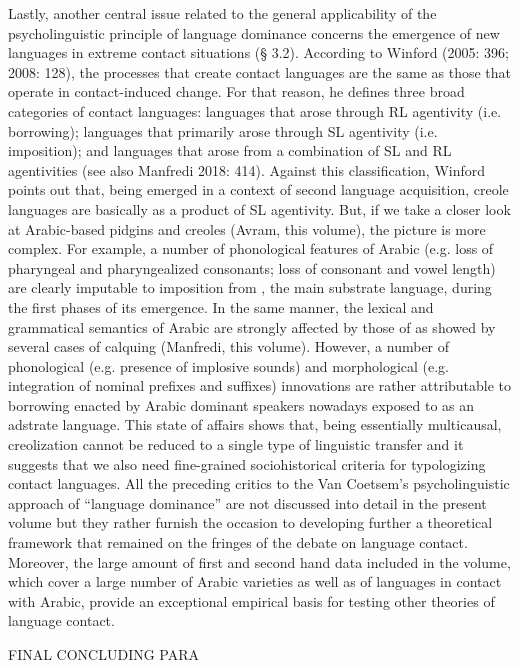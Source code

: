 \documentclass[output=paper]{langsci/langscibook}
\begin{document}
Lastly, another central issue related to the general applicability of the psycholinguistic principle of language dominance concerns the emergence of new languages in extreme contact situations (§ 3.2). According to Winford (2005: 396; 2008: 128), the processes that create contact languages are the same as those that operate in contact-induced change. For that reason, he defines three broad categories of contact languages: languages that arose through RL agentivity (i.e. borrowing); languages that primarily arose through SL agentivity (i.e. imposition); and languages that arose from a combination of SL and RL agentivities (see also Manfredi 2018: 414). Against this classification, Winford points out that, being emerged in a context of second language acquisition, creole languages are basically as a product of SL agentivity. But, if we take a closer look at Arabic-based pidgins and creoles (Avram, this volume), the picture is more complex. For example, a number of phonological features of  Arabic (e.g. loss of pharyngeal and pharyngealized consonants; loss of consonant and vowel length) are clearly imputable to imposition from , the main substrate language, during the first phases of its emergence. In the same manner, the lexical and grammatical semantics of  Arabic are strongly affected by those of  as showed by several cases of calquing (Manfredi, this volume). However, a number of phonological (e.g. presence of implosive sounds) and morphological (e.g. integration of nominal prefixes and suffixes) innovations are rather attributable to borrowing enacted by  Arabic dominant speakers nowadays exposed to  as an adstrate language. This state of affairs shows that, being essentially multicausal, creolization cannot be reduced to a single type of linguistic transfer and it suggests that we also need fine-grained sociohistorical criteria for typologizing contact languages.  
All the preceding critics to the Van Coetsem’s psycholinguistic approach of “language dominance” are not discussed into detail in the present volume but they rather furnish the occasion to developing further a theoretical framework that remained on the fringes of the debate on language contact. Moreover, the large amount of first and second hand data included in the volume, which cover a large number of Arabic varieties as well as of languages in contact with Arabic, provide an exceptional empirical basis for testing other theories of language contact.

FINAL CONCLUDING PARA
\end{document}
